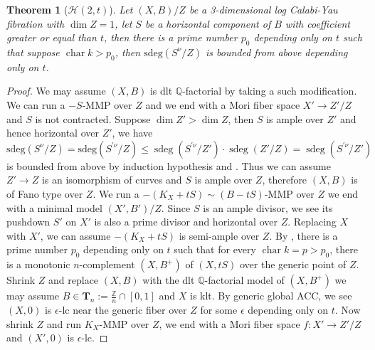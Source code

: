 \documentclass[letterpaper,reqno,12pt]{amsart}
\DeclareMathOperator{\chara}{char}
\DeclareMathOperator{\sdeg}{sdeg}
\numberwithin{equation}{section}
\theoremstyle{plain}
\newtheorem{theorem}{Theorem}[section]
\begin{document}
\begin{theorem}[$\mathcal H(2,t)$]\label{H2t}
    Let $(X,B)/Z$ be a 3-dimensional log Calabi-Yau fibration with $\dim Z=1$, let $S$ be a horizontal component of $B$ with coefficient greater or equal than $t$, then there is a prime number $p_0$ depending only on $t$ such that suppose $\chara k>p_0$, then $\text{sdeg}(S^\nu/Z)$ is bounded from above depending only on $t$.
\end{theorem}
\begin{proof}
    We may assume $(X,B)$ is dlt $\mathbb Q$-factorial by taking a such modification. We can run a $-S$-MMP over $Z$ and we end with a Mori fiber space $X'\to Z'/Z$ and $S$ is not contracted. Suppose $\dim Z'>\dim Z$, then $S$ is ample over $Z'$ and hence horizontal over $Z'$, we have \[\text{sdeg}(S^\nu/Z)=\text{sdeg}(S^{\prime\nu}/Z)\leq \sdeg(S^{\prime\nu}/Z')\cdot\sdeg(Z'/Z)=\sdeg(S^{\prime\nu}/Z')\]
    is bounded from above by induction hypothesis and . Thus we can assume $Z'\to Z$ is an isomorphism of curves and $S$ is ample over $Z$, therefore $(X,B)$ is of Fano type over $Z$. We run a $-(K_X+tS)\sim (B-tS)$-MMP over $Z$ we end with a minimal model $(X',B')/Z$. Since $S$ is an ample divisor, we see its pushdown $S'$ on $X'$ is also a prime divisor and horizontal over $Z$. Replacing $X$ with $X'$, we can assume $-(K_X+tS)$ is semi-ample over $Z$. By \cite[Theorem 1.7]{complement1}, there is a prime number $p_0$ depending only on $t$ such that for every $\chara k=p>p_0$, there is a monotonic $n$-complement $(X,B^+)$ of $(X,tS)$ over the generic point of $Z$. Shrink $Z$ and replace $(X,B)$ with the dlt $\mathbb Q$-factorial model of  $(X,B^+)$ we may assume $B\in \mathbf T_n:=\frac{\mathbb Z}{n}\cap [0,1]$ and $X$ is klt. By generic global ACC, we see $(X,0)$ is $\epsilon$-lc near the generic fiber over $Z$ for some $\epsilon$ depending only on $t$. Now shrink $Z$ and run $K_X$-MMP over $Z$, we end with a Mori fiber space $f:X'\to Z'/Z$ and $(X',0)$ is $\epsilon$-lc.


\end{proof}
\end{document}
